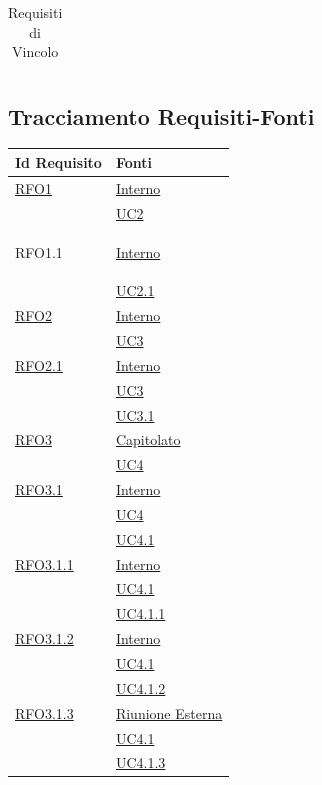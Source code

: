 \begin{itemize}
\begin{itemize}
\begin{itemize}
\begin{itemize}
\begin{longtable}{|c|>{\centering}m{7cm}|c|}
\caption[Requisiti di Vincolo]{Requisiti di Vincolo}
\label{tabella:req3}
\end{longtable}
\clearpage

\subsection{Tracciamento Requisiti-Fonti}
\normalsize
\begin{longtable}{|>{\centering}m{5cm}|m{5cm}<{\centering}|}
\hline
\textbf{Id Requisito} & \textbf{Fonti}\\
\hline
\endhead
\hyperlink{RFO1}{RFO1} & \hyperlink{Interno}{Interno}\\
& \hyperref[UC2]{UC2}\\ \hline

\hypertarget{RFO1.1}{RFO1.1} & \hyperlink{Interno}{Interno}\\
& \hyperref[UC2.1]{UC2.1}\\ \hline

\hyperlink{RFO2}{RFO2} & \hyperlink{Interno}{Interno}\\
& \hyperref[UC3]{UC3}\\ \hline

\hyperlink{RFO2.1}{RFO2.1} & \hyperlink{Interno}{Interno}\\
& \hyperref[UC3]{UC3}\\ 
& \hyperref[UC3.1]{UC3.1}\\\hline

\hyperlink{RFO3}{RFO3} & \hyperlink{Capitolato}{Capitolato}\\
& \hyperref[UC4]{UC4}\\ \hline

\hyperlink{RFO3.1}{RFO3.1} & \hyperlink{Interno}{Interno}\\
& \hyperref[UC4]{UC4}\\
& \hyperref[UC4.1]{UC4.1}\\ \hline

\hyperlink{RFO3.1.1}{RFO3.1.1} & \hyperlink{Interno}{Interno}\\
& \hyperref[UC4.1]{UC4.1}\\
& \hyperref[UC4.1.1]{UC4.1.1}\\ \hline

\hyperlink{RFO3.1.2}{RFO3.1.2} & \hyperlink{Interno}{Interno}\\
& \hyperref[UC4.1]{UC4.1}\\
& \hyperref[UC4.1.2]{UC4.1.2}\\ \hline

\hyperlink{RFO3.1.3}{RFO3.1.3} & \hyperlink{Riunione Esterna}{Riunione Esterna}\\
& \hyperref[UC4.1]{UC4.1}\\
& \hyperref[UC4.1.3]{UC4.1.3}\\ \hline


\end{longtable}
\end{itemize}
\end{itemize}
\end{itemize}
\end{itemize}
